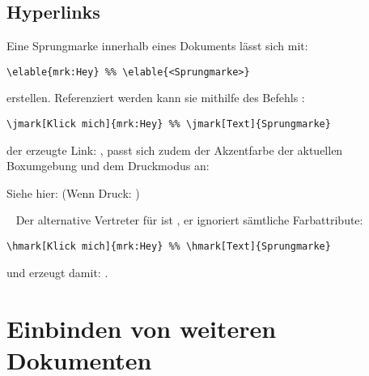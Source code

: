 \subsection{Hyperlinks}
Eine Sprungmarke innerhalb eines Dokuments lässt sich mit:
\begin{lstlisting}[language=lLatex]
\elable{mrk:Hey} %% \elable{<Sprungmarke>}
\end{lstlisting}
erstellen. Referenziert werden kann sie mithilfe des Befehls \textbf{}:
\begin{lstlisting}[language=lLatex]
\jmark[Klick mich]{mrk:Hey} %% \jmark[Text]{Sprungmarke}
\end{lstlisting}
der erzeugte Link: , passt sich zudem der Akzentfarbe der aktuellen Boxumgebung und dem Druckmodus an:\smallskip
\begin{zusammenfassung}[Testzusammenfassung]
Siehe hier:  (Wenn Druck: )
\end{zusammenfassung}~\smallskip\newline
{}Der alternative Vertreter für \textbf{} ist \textbf{}, er ignoriert sämtliche Farbattribute:
\begin{lstlisting}[language=lLatex]
\hmark[Klick mich]{mrk:Hey} %% \hmark[Text]{Sprungmarke}
\end{lstlisting}
und erzeugt damit: .





\section{Einbinden von weiteren Dokumenten}

